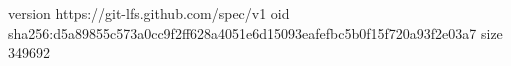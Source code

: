 version https://git-lfs.github.com/spec/v1
oid sha256:d5a89855c573a0cc9f2ff628a4051e6d15093eafefbc5b0f15f720a93f2e03a7
size 349692
